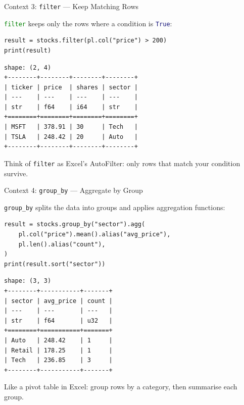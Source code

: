 \documentclass[9pt,aspectratio=169]{beamer}
\newcommand{\py}[1]{\lstinline[language=Python]{#1}}
\begin{document}
\begin{frame}[fragile]{Context 3: \texttt{filter} --- Keep Matching Rows}

\py{filter} keeps only the rows where a condition is \py{True}:

\begin{lstlisting}
result = stocks.filter(pl.col("price") > 200)
print(result)
\end{lstlisting}

\begin{lstlisting}[style=output]
shape: (2, 4)
+--------+--------+--------+--------+
| ticker | price  | shares | sector |
| ---    | ---    | ---    | ---    |
| str    | f64    | i64    | str    |
+========+========+========+========+
| MSFT   | 378.91 | 30     | Tech   |
| TSLA   | 248.42 | 20     | Auto   |
+--------+--------+--------+--------+
\end{lstlisting}

\medskip

\begin{highlightbox}
\centering
Think of \texttt{filter} as Excel's AutoFilter: only rows that match your condition survive.
\end{highlightbox}

\end{frame}


\begin{frame}[fragile]{Context 4: \texttt{group\_by} --- Aggregate by Group}

\py{group_by} splits the data into groups and applies aggregation functions:

\begin{lstlisting}
result = stocks.group_by("sector").agg(
    pl.col("price").mean().alias("avg_price"),
    pl.len().alias("count"),
)
print(result.sort("sector"))
\end{lstlisting}

\begin{lstlisting}[style=output]
shape: (3, 3)
+--------+-----------+-------+
| sector | avg_price | count |
| ---    | ---       | ---   |
| str    | f64       | u32   |
+========+===========+=======+
| Auto   | 248.42    | 1     |
| Retail | 178.25    | 1     |
| Tech   | 236.85    | 3     |
+--------+-----------+-------+
\end{lstlisting}

Like a pivot table in Excel: group rows by a category, then summarise each group.

\end{frame}
\end{document}
